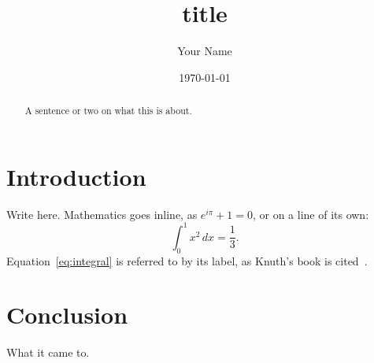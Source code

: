 \documentclass[11pt]{article}
\title{{{title}}}
\author{Your Name}
\date{\today}
\begin{document}
\maketitle

\begin{abstract}
A sentence or two on what this is about.
\end{abstract}

\section{Introduction}
\label{sec:introduction}

Write here. Mathematics goes inline, as $e^{i\pi} + 1 = 0$, or on a line of its own:
\begin{equation}
  \int_0^1 x^2 \, dx = \frac{1}{3}.
  \label{eq:integral}
\end{equation}
Equation~\eqref{eq:integral} is referred to by its label, as Knuth's book is cited~\cite{knuth1984}.

\section{Conclusion}
\label{sec:conclusion}

What it came to.



\end{document}
